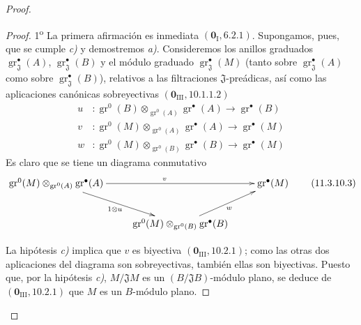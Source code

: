 \begin{proof}
\begin{proof}
1\textsuperscript{o} La primera afirmación es inmediata $(\mathbf 0_{\mathrm I},6.2.1)$. Supongamos, pues, que se cumple \emph{c)} y demostremos \emph{a)}. Consideremos los anillos graduados $\operatorname{gr}_{\mathfrak J}^\bullet(A)$, $\operatorname{gr}_{\mathfrak J}^\bullet(B)$ y el módulo graduado $\operatorname{gr}_{\mathfrak J}^\bullet(M)$ (tanto sobre $\operatorname{gr}_{\mathfrak J}^\bullet(A)$ como sobre $\operatorname{gr}_{\mathfrak J}^\bullet(B)$), relativos a las filtraciones $\mathfrak J$-preádicas, así como las aplicaciones canónicas sobreyectivas $(\mathbf 0_{\mathrm{III}},10.1.1.2)$
\begin{align*}
u&:\operatorname{gr}^0(B)\otimes_{\operatorname{gr}^0(A)}
   \operatorname{gr}^\bullet(A)\longrightarrow\operatorname{gr}^\bullet(B)\\
v&:\operatorname{gr}^0(M)\otimes_{\operatorname{gr}^0(A)}
   \operatorname{gr}^\bullet(A)\longrightarrow\operatorname{gr}^\bullet(M)\\
w&:\operatorname{gr}^0(M)\otimes_{\operatorname{gr}^0(B)}
   \operatorname{gr}^\bullet(B)\longrightarrow\operatorname{gr}^\bullet(M)
\end{align*}
Es claro que se tiene un diagrama conmutativo
\begin{equation}
\xymatrix{
\operatorname{gr}^0(M)\otimes_{\operatorname{gr}^0(A)}\operatorname{gr}^\bullet(A)
 \ar[rr]^v \ar[dr]_{1\otimes u} && \operatorname{gr}^\bullet(M) \\
& \operatorname{gr}^0(M)\otimes_{\operatorname{gr}^0(B)}
  \operatorname{gr}^\bullet(B) \ar[ur]_w &
}
\label{IV.11.3.10.3-fr}
\tag{11.3.10.3}
\end{equation}

La hipótesis \emph{c)} implica que $v$ es biyectiva $(\mathbf 0_{\mathrm{III}},10.2.1)$; como las otras dos aplicaciones del diagrama son sobreyectivas, también ellas son biyectivas. Puesto que, por la hipótesis \emph{c)}, $M/\mathfrak JM$ es un $(B/\mathfrak JB)$-módulo plano, se deduce de $(\mathbf 0_{\mathrm{III}},10.2.1)$ que $M$ es un $B$-módulo plano.


\end{proof}
\end{proof}
